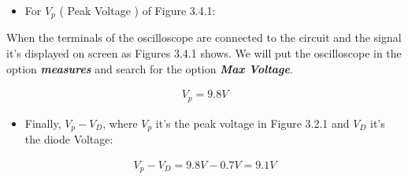 {\bfseries\itshape
\begin{itemize}
\item For $V_{p}$ ( Peak Voltage ) of Figure 3.4.1:
\end{itemize}} 

When the terminals of the oscilloscope are connected to the circuit and the signal it's displayed on screen as Figures 3.4.1 shows. We will put the oscilloscope in the option {\bfseries\itshape measures} and search for the option {\bfseries\itshape Max Voltage}. \hfill \break

\begin{ceqn}
\begin{align}
V_{p} = 9.8 V
\end{align}
\end{ceqn} \hfill 

{\bfseries\itshape
\begin{itemize}
\item Finally, $V_{p} - V_{D}$, where $V_{p}$ it's the peak voltage in Figure 3.2.1 and $V_{D}$ it's the diode Voltage:
\end{itemize}} \hfill

\begin{ceqn}
\begin{align}
V_{p} - V_{D} = 9.8 V - 0.7 V = 9.1 V
\end{align}
\end{ceqn}

\pagebreak